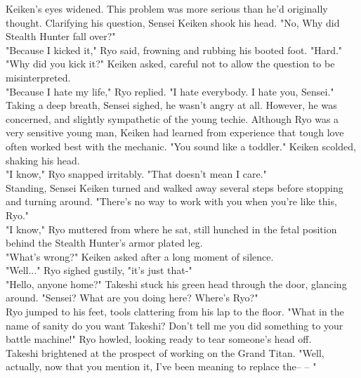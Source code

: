 \documentclass[11pt,twoside,a4paper]{book}
\begin{document}
\begin{multicols*}{2}
Keiken's eyes widened. This problem was more serious than he'd originally thought. Clarifying his question, Sensei Keiken shook his head. "No, Why did Stealth Hunter fall over?" ~\\

"Because I kicked it," Ryo said, frowning and rubbing his booted foot. "Hard." ~\\

"Why did you kick it?" Keiken asked, careful not to allow the question to be misinterpreted. ~\\

"Because I hate my life," Ryo replied. "I hate everybody. I hate you, Sensei." ~\\

Taking a deep breath, Sensei sighed, he wasn't angry at all. However, he was concerned, and slightly sympathetic of the young techie. Although Ryo was a very sensitive young man, Keiken had learned from experience that tough love often worked best with the mechanic. "You sound like a toddler." Keiken scolded, shaking his head. ~\\

"I know," Ryo snapped irritably. "That doesn't mean I care." ~\\

Standing, Sensei Keiken turned and walked away several steps before stopping and turning around. "There's no way to work with you when you're like this, Ryo." ~\\

"I know," Ryo muttered from where he sat, still hunched in the fetal position behind the Stealth Hunter's armor plated leg. ~\\

"What's wrong?" Keiken asked after a long moment of silence. ~\\

"Well..." Ryo sighed gustily, "it's just that-" ~\\

"Hello, anyone home?" Takeshi stuck his green head through the door, glancing around. "Sensei? What are you doing here? Where's Ryo?" ~\\

Ryo jumped to his feet, tools clattering from his lap to the floor. "What in the name of sanity do you want Takeshi? Don't tell me you did something to your battle machine!" Ryo howled, looking ready to tear someone's head off. ~\\

Takeshi brightened at the prospect of working on the Grand Titan. "Well, actually, now that you mention it, I've been meaning to replace the-- -- " ~\\


\end{multicols*}
\end{document}
